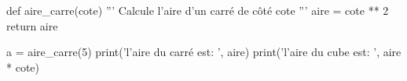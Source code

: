 \documentclass[11pt, a4paper]{report}
\begin{document}
\begin{exercice_cours}

\begin{CodePythontexAlt}[TaillePolice=\large, Largeur=1\linewidth,Centre,Lignes=true,PremLigne=1]{}
def aire_carre(cote)
    ''' Calcule l'aire d'un carré de côté cote '''
    aire = cote ** 2
    return aire

a = aire_carre(5)
print('l'aire du carré est: ', aire)
print('l'aire du cube est: ', aire * cote)
\end{CodePythontexAlt}
\end{exercice_cours}
\end{document}
